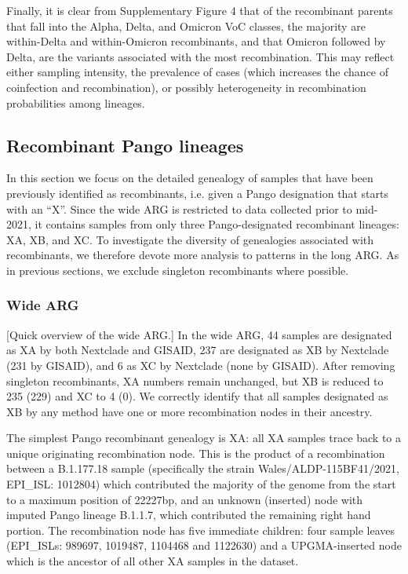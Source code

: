 \documentclass{article}
\begin{document}
Finally, it is clear from Supplementary Figure 4 that of the recombinant
parents that fall into the Alpha, Delta, and Omicron VoC classes, the majority
are within-Delta and within-Omicron recombinants, and that Omicron followed by
Delta, are the variants associated with the most recombination. This may
reflect either sampling intensity, the prevalence of cases (which increases the
chance of coinfection and recombination), or possibly heterogeneity in
recombination probabilities among lineages.

\subsection{Recombinant Pango lineages}
\label{sec:pango_x_lineages}

In this section we focus on the detailed genealogy of samples that have been
previously identified as recombinants, i.e. given a Pango designation that
starts with an ``X''. Since the wide ARG is restricted to data collected prior
to mid-2021, it contains samples from only three Pango-designated recombinant
lineages: XA, XB, and XC. To investigate the diversity of genealogies
associated with recombinants, we therefore devote more analysis to patterns in
the long ARG. As in previous sections, we exclude singleton recombinants where
possible.

\subsubsection{Wide ARG}
[Quick overview of the wide ARG.]
In the wide ARG, 44
samples are designated as XA by both Nextclade and GISAID, 237 are designated
as XB by Nextclade (231 by GISAID), and 6 as XC by Nextclade (none by GISAID).
After removing singleton recombinants, XA numbers remain unchanged, but XB is
reduced to 235 (229) and XC to 4 (0). We correctly identify that all samples
designated as XB by any method have one or more recombination nodes in their
ancestry.

The simplest Pango recombinant genealogy is XA: all XA samples trace back to a
unique originating recombination node. This is the product of a recombination
between a B.1.177.18 sample (specifically the strain Wales/ALDP-115BF41/2021,
EPI\_ISL: 1012804) which contributed the majority of the genome from the start
to a maximum position of 22227bp, and an unknown (inserted) node with imputed
Pango lineage B.1.1.7, which contributed the remaining right hand portion. The
recombination node has five immediate children: four sample leaves (EPI\_ISLs:
989697, 1019487, 1104468 and 1122630) and a UPGMA-inserted node which is the
ancestor of all other XA samples in the dataset.
\end{document}
